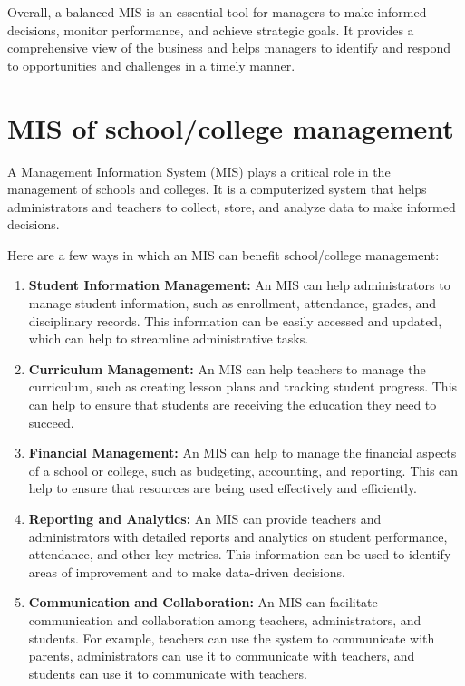 \documentclass[twocolumn, 12pt, a4paper]{article}
\begin{document}
Overall, a balanced MIS is an essential tool for managers to make informed
decisions, monitor performance, and achieve strategic goals. It provides a
comprehensive view of the business and helps managers to identify and respond 
to opportunities and challenges in a timely manner.

\section{MIS of school/college management}
A Management Information System (MIS) plays a critical role in the management 
of schools and colleges. It is a computerized system that helps administrators
and teachers to collect, store, and analyze data to make informed decisions.

Here are a few ways in which an MIS can benefit school/college management:
\begin{enumerate}
  \item \textbf{Student Information Management:} An MIS can help
    administrators to manage student information, such as enrollment,
    attendance, grades, and disciplinary records. This information can be
    easily accessed and updated, which can help to streamline administrative
    tasks.
  
  \item \textbf{Curriculum Management:} An MIS can help teachers to manage the
    curriculum, such as creating lesson plans and tracking student progress.
    This can help to ensure that students are receiving the education they
    need to succeed.
  
  \item \textbf{Financial Management:} An MIS can help to manage the financial
    aspects of a school or college, such as budgeting, accounting, and
    reporting. This can help to ensure that resources are being used
    effectively and efficiently.
  
  \item \textbf{Reporting and Analytics:} An MIS can provide teachers and 
    administrators with detailed reports and analytics on student performance,
    attendance, and other key metrics. This information can be used to
    identify areas of improvement and to make data-driven decisions.
  
  \item \textbf{Communication and Collaboration:} An MIS can facilitate
    communication and collaboration among teachers, administrators, and
    students. For example, teachers can use the system to communicate with
    parents, administrators can use it to communicate with teachers, and
    students can use it to communicate with teachers.
\end{enumerate}
\end{document}
